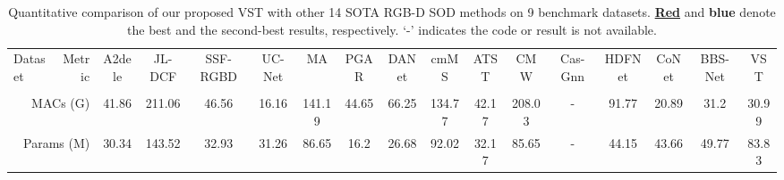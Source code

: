 \documentclass[10pt,twocolumn,letterpaper]{article}
\def\blu#1{\textbf{\color{blue} #1}} \def\red#1{\textbf{\color{red}\underline{#1}}}
\begin{document}
\begin{table*}[t]
  \centering
  \footnotesize
  \renewcommand{\arraystretch}{1.0}
  \renewcommand{\tabcolsep}{0.7mm}
 \caption{Quantitative comparison of our proposed VST with other 14 SOTA RGB-D SOD methods on 9 benchmark datasets. \red{Red} and \blu{blue} denote the best and the second-best results, respectively. `-' indicates the code or result is not available.}
  \begin{tabular}{lr|cccccccccccccc|c}
  \hline

    Dataset
    & Metric
    & A2dele &JL-DCF & SSF-RGBD & UC-Net & MA & PGAR & DANet & cmMS & ATST  & CMW & Cas-Gnn & HDFNet & CoNet & BBS-Net & VST\\
    &
    & \cite{piao2020a2dele} &\cite{Fu2020JLDCF} & \cite{zhang2020select}   & \cite{zhang2020ucnet} & \cite{liu2020S2MA} & \cite{chen2020PGAR} & \cite{zhao2020DANet} & \cite{li2020cmMS} & \cite{zhang2020ATSA} &\cite{Li2020CMWNet} & \cite{luo2020Cas-Gnn} & \cite{HDFNet-ECCV2020} & \cite{Wei2020CoNet} & \cite{fan2020bbsnet}\\ \hline

   \multicolumn{2}{r|}{MACs (G)}  &41.86 &211.06 &46.56 &16.16 &141.19	&44.65 &66.25 &134.77 &42.17 &208.03 &-	&91.77 &20.89 &31.2 &30.99\\
   \multicolumn{2}{r|}{Params (M)} &30.34 &143.52 &32.93 &31.26 &86.65	&16.2 &26.68 &92.02 &32.17 &85.65 &- &44.15	&43.66 &49.77 &83.83\\
     \hline
     

\end{tabular}
\end{table*}
\end{document}
